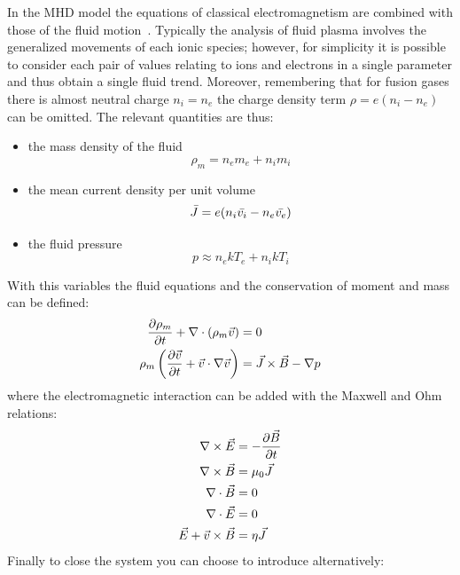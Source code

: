 In the MHD model the equations of classical electromagnetism are combined with those of the fluid motion~\cite{Wesson-4th}. Typically the analysis of fluid plasma involves the generalized movements of each ionic species; however, for simplicity it is possible to consider each pair of values relating to ions and electrons in a single parameter and thus obtain a single fluid trend. Moreover, remembering that for fusion gases there is almost neutral charge $n_i = n_e$ the charge density term $\rho = e(n_i - n_e)$ can be omitted. The relevant quantities are thus:
\begin{itemize}
    \item the mass density of the fluid
    \begin{equation}
        \rho_m = n_e m_e + n_i m_i
    \end{equation}
    \item the mean current density per unit volume
    \begin{equation}
        \bar{J} = e(n_i \bar{v_i} - n_e \bar{v_e})
    \end{equation}
    \item the fluid pressure
    \begin{equation}
        p \approx n_e k T_e + n_i k T_i
    \end{equation}
\end{itemize}
With this variables the fluid equations and the conservation of moment and mass can be defined:
\begin{align}
    \pdv{\rho_m}{t} + \nabla \cdot (\rho_m \Vec{v}) &= 0 \\
    \rho_m \left( \pdv{\Vec{v}}{t} + \Vec{v} \cdot \nabla \Vec{v} \right) &= \Vec{J} \times \Vec{B} - \nabla p
    \label{eq:mhd_momentum} 
 \end{align}
where the electromagnetic interaction can be added with the Maxwell and Ohm relations:
\begin{align}
    \nabla \times \Vec{E} &= - \pdv{\Vec{B}}{t} \label{eq:faraday} \\
    \nabla \times \Vec{B} &= \mu_0 \Vec{J} \label{eq:ampere} \\
    \nabla \cdot \Vec{B}  &= 0 \\
    \nabla \cdot \Vec{E}  &= 0 \\
    \Vec{E} + \Vec{v} \times \Vec{B} &= \eta \Vec{J} \label{eq:ohm}
\end{align}
Finally to close the system you can choose to introduce alternatively:
